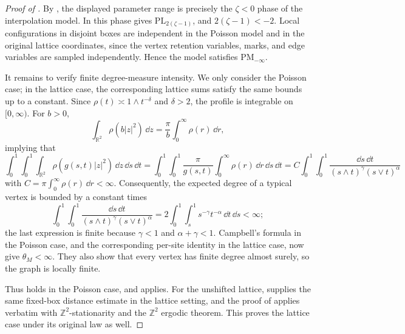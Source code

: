 \documentclass[11pt,a4paper]{scrartcl}
\newcommand{\Z}{\mathbb{Z}}
\newcommand{\R}{\mathbb{R}}
\newcommand{\1}{\mathbb{1}}
\begin{document}
\begin{proof}[Proof of ]
By \cite[Proposition~2.3]{jacobJahLu2024}, the displayed parameter range is
precisely the \(\zeta<0\) phase of the interpolation model.  In this phase
\cite[Lemma~2]{lue2024spatialrandomgraphsweak} gives
\(\mathrm{PL}_{2(\zeta-1)}\), and \(2(\zeta-1)<-2\).  Local configurations in
disjoint boxes are independent in the Poisson model and in the original
lattice coordinates, since the vertex retention variables, marks, and edge
variables are sampled independently.  Hence the model satisfies
\(\mathrm{PM}_{-\infty}\).

It remains to verify finite degree-measure intensity.
We only consider the Poisson case; in the lattice case, the corresponding lattice sums satisfy the same bounds
up to a constant. Since
\(\rho(t)\asymp 1\wedge t^{-\delta}\) and \(\delta>2\), the profile is
integrable on \([0,\infty)\).  For \(b>0\),
\[
  \int_{\R^2}\rho(b|z|^2)\,\dd z
  =
  \frac{\pi}{b}\int_0^\infty\rho(r)\,\dd r,
\]
implying that
\begin{equation*}
    \int_0^1 \int_0^1 \int_{\R^2} \rho \left( g(s,t) |z|^2 \right) \, \dd z \, \dd s \, \dd t = \int_0^1 \int_0^1 \frac{\pi}{g(s,t)} \int_0^\infty \rho(r) \, \dd r \, \dd s \, \dd t 
    = 
    C \int_0^1 \int_0^1 \frac{\dd s \, \dd t}{(s\wedge t)^\gamma (s\vee t)^\alpha} 
\end{equation*}
with $C=\pi \int_0^\infty \rho(r) \, \dd r < \infty$.
Consequently, the expected degree of a typical vertex is
bounded by a constant times
\[
  \int_0^1\int_0^1
  \frac{\dd s\,\dd t}
       {(s\wedge t)^\gamma(s\vee t)^\alpha}
  =
  2\int_0^1\int_s^1 s^{-\gamma}t^{-\alpha}\,\dd t\,\dd s
  <\infty;
\]
the last expression is finite because \(\gamma<1\) and \(\alpha+\gamma<1\).  Campbell's formula in the
Poisson case, and the corresponding per-site identity in the lattice case,
now give \(\theta_M<\infty\).  They also show that every vertex has finite
degree almost surely, so the graph is locally finite.

Thus  holds in the Poisson case, and
 applies.  For the unshifted lattice,
\cite[Theorem~1]{lue2024spatialrandomgraphsweak} supplies the same fixed-box
distance estimate in the lattice setting, and the proof of
 applies verbatim with \(\Z^2\)-stationarity
and the \(\Z^2\) ergodic theorem.  This proves the lattice case under its
original law as well.
\end{proof}
\end{document}
